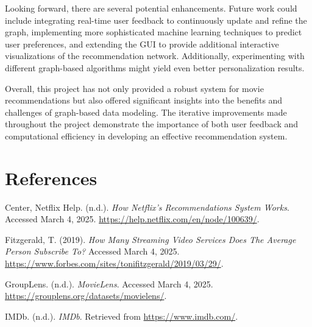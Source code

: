 \documentclass[12pt]{article}
\begin{document}
Looking forward, there are several potential enhancements. Future work could include integrating real-time user feedback to continuously update and refine the graph, implementing more sophisticated machine learning techniques to predict user preferences, and extending the GUI to provide additional interactive visualizations of the recommendation network. Additionally, experimenting with different graph-based algorithms might yield even better personalization results.

Overall, this project has not only provided a robust system for movie recommendations but also offered significant insights into the benefits and challenges of graph-based data modeling. The iterative improvements made throughout the project demonstrate the importance of both user feedback and computational efficiency in developing an effective recommendation system.

\section{References}
\begin{thebibliography}{9}
Center, Netflix Help. (n.d.). \textit{How Netflix’s Recommendations System Works}. Accessed March 4, 2025. \url{https://help.netflix.com/en/node/100639/}.

Fitzgerald, T. (2019). \textit{How Many Streaming Video Services Does The Average Person Subscribe To?} Accessed March 4, 2025. \url{https://www.forbes.com/sites/tonifitzgerald/2019/03/29/}.

GroupLens. (n.d.). \textit{MovieLens}. Accessed March 4, 2025. \url{https://grouplens.org/datasets/movielens/}.

IMDb. (n.d.). \textit{IMDb}. Retrieved from \url{https://www.imdb.com/}.

\end{thebibliography}
\end{document}
